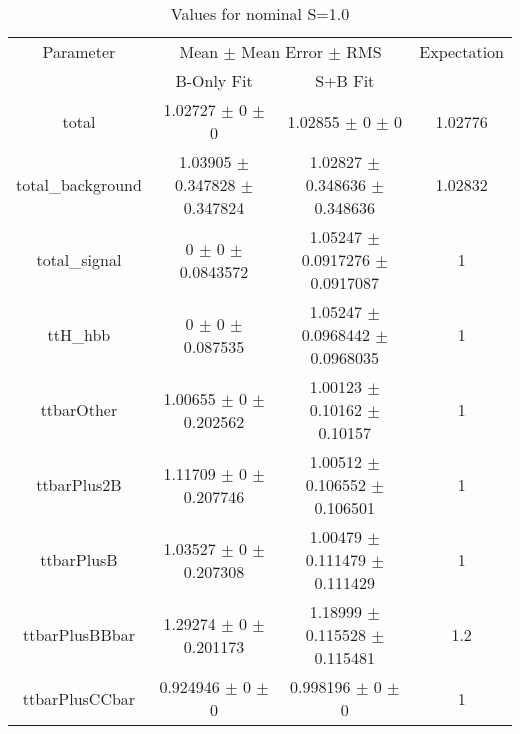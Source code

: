 \begin{table}
\centering
\caption{Values for nominal S=1.0}
\begin{tabular}{cccc}
\toprule
Parameter & \multicolumn{2}{c}{Mean $\pm$ Mean Error $\pm$ RMS} & Expectation\\
 & B-Only Fit & S+B Fit & \\
\midrule
total & \num{1.02727} $\pm$ \num{0} $\pm$ \num{0} & \num{1.02855} $\pm$ \num{0} $\pm$ \num{0} & \num{1.02776}\\
total\_background & \num{1.03905} $\pm$ \num{0.347828} $\pm$ \num{0.347824} & \num{1.02827} $\pm$ \num{0.348636} $\pm$ \num{0.348636} & \num{1.02832}\\
total\_signal & \num{0} $\pm$ \num{0} $\pm$ \num{0.0843572} & \num{1.05247} $\pm$ \num{0.0917276} $\pm$ \num{0.0917087} & \num{1}\\
ttH\_hbb & \num{0} $\pm$ \num{0} $\pm$ \num{0.087535} & \num{1.05247} $\pm$ \num{0.0968442} $\pm$ \num{0.0968035} & \num{1}\\
ttbarOther & \num{1.00655} $\pm$ \num{0} $\pm$ \num{0.202562} & \num{1.00123} $\pm$ \num{0.10162} $\pm$ \num{0.10157} & \num{1}\\
ttbarPlus2B & \num{1.11709} $\pm$ \num{0} $\pm$ \num{0.207746} & \num{1.00512} $\pm$ \num{0.106552} $\pm$ \num{0.106501} & \num{1}\\
ttbarPlusB & \num{1.03527} $\pm$ \num{0} $\pm$ \num{0.207308} & \num{1.00479} $\pm$ \num{0.111479} $\pm$ \num{0.111429} & \num{1}\\
ttbarPlusBBbar & \num{1.29274} $\pm$ \num{0} $\pm$ \num{0.201173} & \num{1.18999} $\pm$ \num{0.115528} $\pm$ \num{0.115481} & \num{1.2}\\
ttbarPlusCCbar & \num{0.924946} $\pm$ \num{0} $\pm$ \num{0} & \num{0.998196} $\pm$ \num{0} $\pm$ \num{0} & \num{1}\\
\bottomrule
\end{tabular}
\end{table}